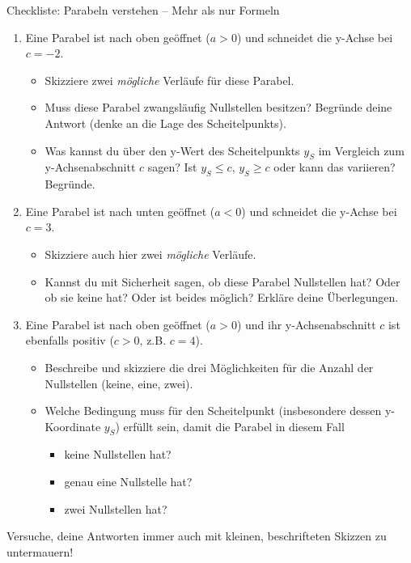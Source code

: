 \begin{aufgabenumgebung}{Checkliste: Parabeln verstehen – Mehr als nur Formeln}
\begin{enumerate}[label=\textbf{Teil \arabic*:}]
    \begin{enumerate}[label=(\alph*)]
        \item Eine Parabel ist nach oben geöffnet ($a > 0$) und schneidet die y-Achse bei $c = -2$.
        \begin{itemize}
            \item Skizziere zwei \textit{mögliche} Verläufe für diese Parabel.
            \item Muss diese Parabel zwangsläufig Nullstellen besitzen? Begründe deine Antwort (denke an die Lage des Scheitelpunkts).
            \item Was kannst du über den y-Wert des Scheitelpunkts $y_S$ im Vergleich zum y-Achsenabschnitt $c$ sagen? Ist $y_S \leq c$, $y_S \geq c$ oder kann das variieren? Begründe.
        \end{itemize}
        \item Eine Parabel ist nach unten geöffnet ($a < 0$) und schneidet die y-Achse bei $c = 3$.
        \begin{itemize}
            \item Skizziere auch hier zwei \textit{mögliche} Verläufe.
            \item Kannst du mit Sicherheit sagen, ob diese Parabel Nullstellen hat? Oder ob sie keine hat? Oder ist beides möglich? Erkläre deine Überlegungen.
        \end{itemize}
        \item Eine Parabel ist nach oben geöffnet ($a > 0$) und ihr y-Achsenabschnitt $c$ ist ebenfalls positiv ($c > 0$, z.B. $c=4$).
        \begin{itemize}
            \item Beschreibe und skizziere die drei Möglichkeiten für die Anzahl der Nullstellen (keine, eine, zwei).
            \item Welche Bedingung muss für den Scheitelpunkt (insbesondere dessen y-Koordinate $y_S$) erfüllt sein, damit die Parabel in diesem Fall
            \begin{itemize}
                \item keine Nullstellen hat?
                \item genau eine Nullstelle hat?
                \item zwei Nullstellen hat?
            \end{itemize}
        \end{itemize}
    \end{enumerate}
\end{enumerate}
Versuche, deine Antworten immer auch mit kleinen, beschrifteten Skizzen zu untermauern!
\end{aufgabenumgebung}



